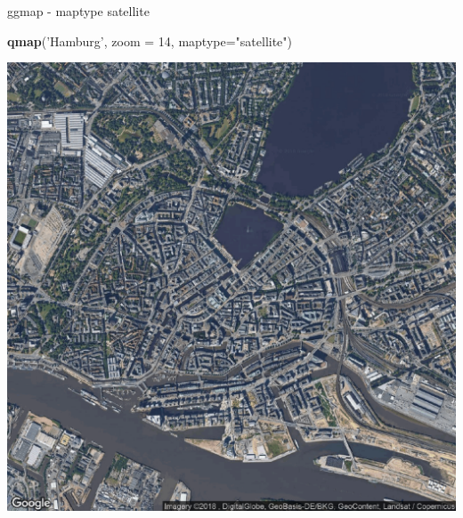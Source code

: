 \documentclass[ignorenonframetext,]{beamer}
\newenvironment{Shaded}{\begin{snugshade}}{\end{snugshade}}
\newcommand{\DataTypeTok}[1]{\textcolor[rgb]{0.13,0.29,0.53}{#1}}
\newcommand{\DecValTok}[1]{\textcolor[rgb]{0.00,0.00,0.81}{#1}}
\newcommand{\KeywordTok}[1]{\textcolor[rgb]{0.13,0.29,0.53}{\textbf{#1}}}
\newcommand{\NormalTok}[1]{#1}
\newcommand{\StringTok}[1]{\textcolor[rgb]{0.31,0.60,0.02}{#1}}
\begin{document}
\begin{frame}[fragile]{ggmap - maptype satellite}
\protect\hypertarget{ggmap---maptype-satellite}{}

\begin{Shaded}
\begin{Highlighting}[]
\KeywordTok{qmap}\NormalTok{(}\StringTok{'Hamburg'}\NormalTok{, }\DataTypeTok{zoom =} \DecValTok{14}\NormalTok{, }\DataTypeTok{maptype=}\StringTok{"satellite"}\NormalTok{)}
\end{Highlighting}
\end{Shaded}

\includegraphics{figure/ham_map_sat.pdf}

\end{frame}
\end{document}
